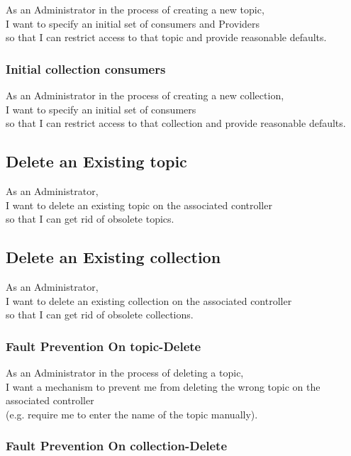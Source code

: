 As an Administrator in the process of creating a new topic,\\
I want to specify an initial set of consumers and Providers \\
so that I can restrict access to that topic and provide reasonable defaults.

\subsubsection{Initial collection consumers}\label{sec:requirement-initial-collection-consumer}

As an Administrator in the process of creating a new collection,\\
I want to specify an initial set of consumers \\
so that I can restrict access to that collection and provide reasonable defaults.

\subsection{Delete an Existing topic}\label{sec:delete-topic}

As an Administrator,\\
I want to delete an existing topic on the associated controller\\
so that I can get rid of obsolete topics.

\subsection{Delete an Existing collection}\label{sec:delete-collection}

As an Administrator,\\
I want to delete an existing collection on the associated controller\\
so that I can get rid of obsolete collections.


\subsubsection{Fault Prevention On topic-Delete}

As an Administrator in the process of deleting a topic, \\
I want a mechanism to prevent me from deleting the wrong topic on the associated controller\\
(e.g. require me to enter the name of the topic manually).

\subsubsection{Fault Prevention On collection-Delete}

